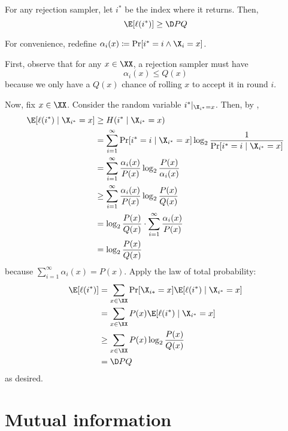 \documentclass[class=co432,notes,tikz]{agony}
\begin{document}
\begin{prop}\label{prop:rejbest}
  For any rejection sampler, let $i^*$ be the index where it returns. Then,
  \[ \E[\ell(i^*)] \geq \D P Q \]
\end{prop}
\begin{prf}
  For convenience, redefine $\alpha_i(x) \coloneqq \Pr[i^* = i \land \X_i = x]$.

  First, observe that for any $x\in\XX$, a rejection sampler must have
  \[ \alpha_i(x) \leq Q(x) \]
  because we only have a $Q(x)$ chance of rolling $x$ to accept it in round $i$.

  Now, fix $x\in\XX$. Consider the random variable $i^*|_{\X_{i^*}=x}$.
  Then, by ,
  \begin{align*}
    \E[\ell(i^*) \mid \X_{i^*}=x]
     & \geq H(i^* \mid \X_{i^*}=x)                                                             \\
     & = \sum_{i=1}^\infty \Pr[i^*=i\mid \X_{i^*}=x]\log_2\frac{1}{\Pr[i^*=i \mid \X_{i^*}=x]} \\
     & = \sum_{i=1}^\infty \frac{\alpha_i(x)}{P(x)}\log_2\frac{P(x)}{\alpha_i(x)}              \\
     & \geq \sum_{i=1}^\infty \frac{\alpha_i(x)}{P(x)}\log_2\frac{P(x)}{Q(x)}                  \\
     & = \log_2\frac{P(x)}{Q(x)} \cdot \sum_{i=1}^\infty \frac{\alpha_i(x)}{P(x)}              \\
     & = \log_2\frac{P(x)}{Q(x)}
  \end{align*}
  because $\sum_{i=1}^\infty \alpha_i(x) = P(x)$.
  Apply the law of total probability:
  \begin{align*}
    \E[\ell(i^*)] & = \sum_{x\in \XX} \Pr[\X_{i*}=x] \E[\ell(i^*) \mid \X_{i^*}=x] \\
                  & = \sum_{x\in \XX} P(x) \E[\ell(i^*) \mid \X_{i^*}=x]           \\
                  & \geq \sum_{x\in \XX} P(x) \log_2 \frac{P(x)}{Q(x)}             \\
                  & = \D P Q
  \end{align*}
  as desired.
\end{prf}

\chapter{Mutual information}
\end{document}
